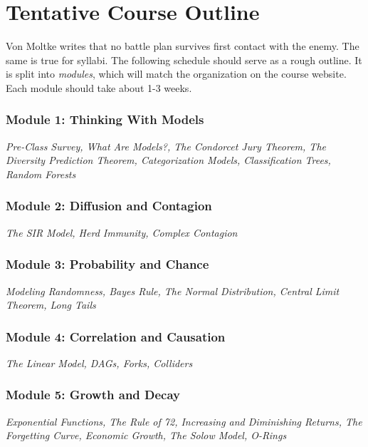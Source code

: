 \documentclass[11pt, letterpaper]{article}
\begin{document}
\section*{Tentative Course Outline}

Von Moltke writes that no battle plan survives first contact with the enemy. The same is true for syllabi. The following schedule should serve as a rough outline. It is split into \textit{modules}, which will match the organization on the course website. Each module should take about 1-3 weeks. 

\subsubsection*{Module 1: Thinking With Models}
\textit{Pre-Class Survey, What Are Models?, The Condorcet Jury Theorem, The Diversity Prediction Theorem, Categorization Models, Classification Trees, Random Forests}

\subsubsection*{Module 2: Diffusion and Contagion}
\textit{The SIR Model, Herd Immunity, Complex Contagion}

\subsubsection*{Module 3: Probability and Chance}
\textit{Modeling Randomness, Bayes Rule, The Normal Distribution, Central Limit Theorem, Long Tails}

\subsubsection*{Module 4: Correlation and Causation}
\textit{The Linear Model, DAGs, Forks, Colliders}

\subsubsection*{Module 5: Growth and Decay}
\textit{Exponential Functions, The Rule of 72, Increasing and Diminishing Returns, The Forgetting Curve, Economic Growth, The Solow Model, O-Rings}
\end{document}
